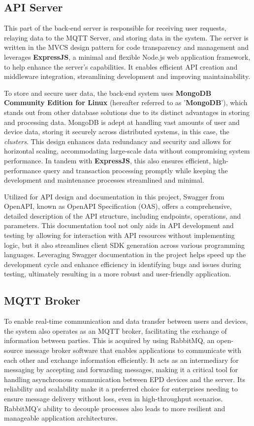 \documentclass[../Main.tex]{subfiles}
\begin{document}
\subsection{API Server}
This part of the back-end server is responsible for receiving user requests, relaying data to the MQTT Server, and storing data in the system. The server is written in the MVCS design pattern for code transparency and management and leverages \textbf{ExpressJS}, a minimal and flexible Node.js web application framework, to help enhance the server's capabilities. It enables efficient API creation and middleware integration, streamlining development and improving maintainability. 

To store and secure user data, the back-end system uses \textbf{MongoDB Community Edition for Linux} (hereafter referred to as '\textbf{MongoDB}'), which stands out from other database solutions due to its distinct advantages in storing and processing data. MongoDB is adept at handling vast amounts of user and device data, storing it securely across distributed systems, in this case, the \textit{clusters}. This design enhances data redundancy and security and allows for horizontal scaling, accommodating large-scale data without compromising system performance. In tandem with \textbf{ExpressJS}, this also ensures efficient, high-performance query and transaction processing promptly while keeping the development and maintenance processes streamlined and minimal.

Utilized for API design and documentation in this project, Swagger from OpenAPI, known as OpenAPI Specification (OAS), offers a comprehensive, detailed description of the API structure, including endpoints, operations, and parameters. This documentation tool not only aids in API development and testing by allowing for interaction with API resources without implementing logic, but it also streamlines client SDK generation across various programming languages. Leveraging Swagger documentation in the project helps speed up the development cycle and enhance efficiency in identifying bugs and issues during testing, ultimately resulting in a more robust and user-friendly application.

\subsection{MQTT Broker}
To enable real-time communication and data transfer between users and devices, the system also operates as an MQTT broker, facilitating the exchange of information between parties. This is acquired by using RabbitMQ, an open-source message broker software that enables applications to communicate with each other and exchange information efficiently. It acts as an intermediary for messaging by accepting and forwarding messages, making it a critical tool for handling asynchronous communication between EPD devices and the server. Its reliability and scalability make it a preferred choice for enterprises needing to ensure message delivery without loss, even in high-throughput scenarios. RabbitMQ's ability to decouple processes also leads to more resilient and manageable application architectures.
\end{document}
